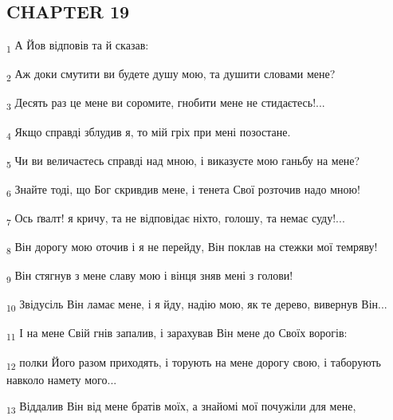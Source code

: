 \subsection{CHAPTER 19}
\begin{tcolorbox}
\textsubscript{1} А Йов відповів та й сказав:
\end{tcolorbox}
\begin{tcolorbox}
\textsubscript{2} Аж доки смутити ви будете душу мою, та душити словами мене?
\end{tcolorbox}
\begin{tcolorbox}
\textsubscript{3} Десять раз це мене ви соромите, гнобити мене не стидаєтесь!...
\end{tcolorbox}
\begin{tcolorbox}
\textsubscript{4} Якщо справді зблудив я, то мій гріх при мені позостане.
\end{tcolorbox}
\begin{tcolorbox}
\textsubscript{5} Чи ви величаєтесь справді над мною, і виказуєте мою ганьбу на мене?
\end{tcolorbox}
\begin{tcolorbox}
\textsubscript{6} Знайте тоді, що Бог скривдив мене, і тенета Свої розточив надо мною!
\end{tcolorbox}
\begin{tcolorbox}
\textsubscript{7} Ось ґвалт! я кричу, та не відповідає ніхто, голошу, та немає суду!...
\end{tcolorbox}
\begin{tcolorbox}
\textsubscript{8} Він дорогу мою оточив і я не перейду, Він поклав на стежки мої темряву!
\end{tcolorbox}
\begin{tcolorbox}
\textsubscript{9} Він стягнув з мене славу мою і вінця зняв мені з голови!
\end{tcolorbox}
\begin{tcolorbox}
\textsubscript{10} Звідусіль Він ламає мене, і я йду, надію мою, як те дерево, вивернув Він...
\end{tcolorbox}
\begin{tcolorbox}
\textsubscript{11} І на мене Свій гнів запалив, і зарахував Він мене до Своїх ворогів:
\end{tcolorbox}
\begin{tcolorbox}
\textsubscript{12} полки Його разом приходять, і торують на мене дорогу свою, і таборують навколо намету мого...
\end{tcolorbox}
\begin{tcolorbox}
\textsubscript{13} Віддалив Він від мене братів моїх, а знайомі мої почужіли для мене,
\end{tcolorbox}
